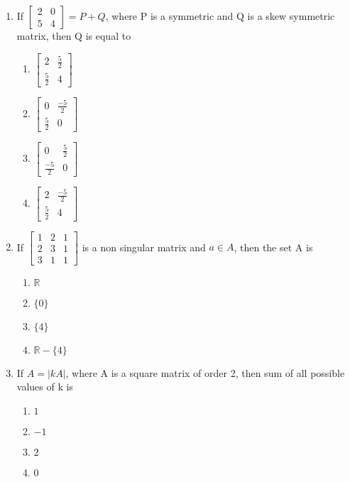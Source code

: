 \begin{enumerate}
    \item If $\begin{bmatrix} 2& 0 \\5& 4 \end{bmatrix}=P + Q$, where P is a symmetric and Q is a skew symmetric matrix, then Q is equal to
    \begin{enumerate}
        \item $ \begin{bmatrix} 2& \frac{5}{2}\\ \frac{5}{2}& 4 \end{bmatrix} $
        \item $ \begin{bmatrix} 0& \frac{-5}{2}\\ \frac{5}{2}& 0 \end{bmatrix} $ 
        \item $ \begin{bmatrix} 0& \frac{5}{2}\\ \frac{-5}{2}& 0 \end{bmatrix} $ 
        \item $  \begin{bmatrix} 2& \frac{-5}{2}\\ \frac{5}{2}& 4 \end{bmatrix} $ 
    \end{enumerate}
    \item If $\begin{bmatrix} 1& 2& 1\\ 2& 3& 1\\ 3& 1& 1 \end{bmatrix}$ is a non singular matrix and $a \in A$, then the set A is
    \begin{enumerate}
        \item $ \mathbb{R} $
        \item $ \{0\} $ 
        \item $  \{4\} $ 
        \item $ \mathbb{R} - \{4\} $ 
    \end{enumerate}
    \item If $A=\lvert kA \rvert$, where A is a square matrix of order 2, then sum of all possible values of k is
    \begin{enumerate}
        \item $  1 $
        \item $  -1 $ 
        \item $  2 $ 
        \item $  0 $ 
    \end{enumerate}

\end{enumerate}
